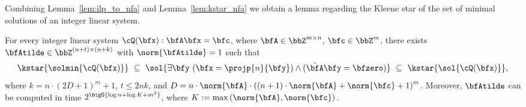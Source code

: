 Combining Lemma~\ref{lem:ilp_to_nfa} and Lemma~\ref{lem:kstar_nfa} we obtain
a lemma regarding the Kleene star of the set of minimal solutions of an integer linear system.
\begin{lemma}\label{lemma:kleene_minimal}
    For every integer linear system $\cQ(\bfx): \bfA \bfx = \bfc$,
    where $\bfA \in \bbZ^{m \times n}$, $\bfc \in \bbZ^{m}$,
    there exists $\bfAtilde \in \bbZ^{(n+t) \times (n+k)}$ with $\norm{\bfAtilde} = 1$
    such that
    \begin{equation*}
        \kstar{\solmin{\cQ(\bfx)}}
        \ \subseteq\ 
        \sol{\exists \bfy\ (\bfx = \projp{n}{\bfy}) \land (\tilde{\bfA} \bfy = \bfzero)}
        \ \subseteq\ 
        \kstar{\sol{\cQ(\bfx)}},
    \end{equation*}
    where 
    $k = n\cdot(2D+1)^{m} + 1$,
    $t \le 2nk$, and
    $D = n \cdot \norm{\bfA} \cdot \left((n+1)\cdot \norm{\bfA} + \norm{\bfc} + 1\right)^{m}$.
    Moreover, $\bfAtilde$ can be computed in time $2^\bigO{\log n + \log K + m^2}$,
    where $K := \max\left(\norm{\bfA}, \norm{\bfc}\right)$.
\end{lemma}

